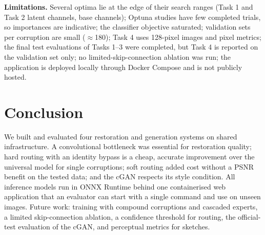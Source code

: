 \documentclass[conference]{IEEEtran}
\begin{document}
\textbf{Limitations.} Several optima lie at the edge of their search ranges (Task 1 and Task 2 latent channels, base channels); Optuna studies have few completed trials, so importances are indicative; the classifier objective saturated; validation sets per corruption are small ($\approx$180); Task 4 uses 128-pixel images and pixel metrics; the final test evaluations of Tasks 1--3 were completed, but Task 4 is reported on the validation set only; no limited-skip-connection ablation was run; the application is deployed locally through Docker Compose and is not publicly hosted.

\section{Conclusion}
We built and evaluated four restoration and generation systems on shared infrastructure. A convolutional bottleneck was essential for restoration quality; hard routing with an identity bypass is a cheap, accurate improvement over the universal model for single corruptions; soft routing added cost without a PSNR benefit on the tested data; and the cGAN respects its style condition. All inference models run in ONNX Runtime behind one containerised web application that an evaluator can start with a single command and use on unseen images. Future work: training with compound corruptions and cascaded experts, a limited skip-connection ablation, a confidence threshold for routing, the official-test evaluation of the cGAN, and perceptual metrics for sketches.

\appendices
\end{document}
